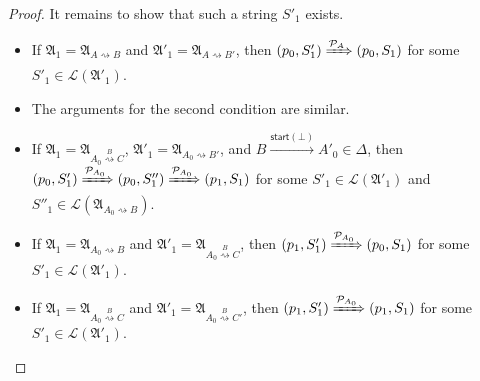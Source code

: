 \documentclass[preprint,12pt]{elsarticle}
\newcommand\Mm{{\mathcal{M} }}
\newcommand\Pp{{\mathcal{P} }}
\newcommand\aft{{\sf Aft}}
\newcommand\startactivity{{\mathsf{start} }}
\newcommand{\hide}[1]{}
\newcommand\aname{\mathfrak{n}}
\newcommand\Rel{\mathsf{Rel}}
\newcommand\Aut{{\mathfrak{A} }}
\newcommand\Lang{{\mathscr{L} }}
\begin{document}
\begin{proof}
It remains to show that such a string $S'_1$ exists. 
\begin{itemize}
\item If $\Aut_1 = \Aut_{A \rightsquigarrow B}$ and $\Aut'_1 = \Aut_{A \rightsquigarrow B'}$, then $(p_0, S'_1) \xRightarrow{\Pp_A} (p_0, S_1)$ for some $S'_1 \in \Lang(\Aut'_1)$. 
%
\item The arguments for the second condition are similar. 
%
\item If $\Aut_1 = \Aut_{A_0 \stackrel{B}{\rightsquigarrow} C}$, $\Aut'_1 = \Aut_{A_0 \rightsquigarrow B'}$, and $B \xrightarrow{\startactivity(\bot)} A'_0 \in \Delta$, then $(p_0, S'_1) \xRightarrow{\Pp_{A_0}} (p_0, S''_1) \xRightarrow{\Pp_{A_0}} (p_1, S_1)$ for some $S'_1 \in \Lang(\Aut'_1)$ and $S''_1 \in \Lang(\Aut_{A_0 \rightsquigarrow B})$. 
%
\item If $\Aut_1 = \Aut_{A_0 \rightsquigarrow B}$ and $\Aut'_1 = \Aut_{A_0 \stackrel{B}{\rightsquigarrow} C}$, then $(p_1, S'_1) \xRightarrow{\Pp_{A_0}}  (p_0, S_1)$ for some $S'_1 \in \Lang(\Aut'_1)$. 
%
\item If $\Aut_1 = \Aut_{A_0 \stackrel{B}{\rightsquigarrow} C}$ and $\Aut'_1 = \Aut_{A_0 \stackrel{B}{\rightsquigarrow} C'}$, then $(p_1, S'_1) \xRightarrow{\Pp_{A_0}}  (p_1, S_1)$ for some $S'_1 \in \Lang(\Aut'_1)$. 
\end{itemize}
 \hide{
Therefore, $(S'_1, S_2, \cdots, S_k) \in \Rel((\Aut_{A\rightsquigarrow B'}, \Aut_2, \cdots, \Aut_k))$ for some $S'_1 \in \Lang(\Aut_{A\rightsquigarrow B'})$. 

Then according to the induction hypothesis, 
$$(([A_0], \aft(A_0))) \xRightarrow[\Mm]{} ((S'_1, \aname_1), (S_2, \aname_2), \cdots, (S_k, \aname_k)).$$

From $S'_1 \in \Lang(\Aut_{A\rightsquigarrow B'})$, $S_1 \in \Lang(\Aut_{A\rightsquigarrow B})$, and the definition of $\Pp_A$, we know that $(p_0, S'_1) \xRightarrow{\Pp_A} (p_0, [A]) \xRightarrow{\Pp_A} (p_0, S_1)$. 

Therefore, 
$$((S'_1, \aname_1), (S_2, \aname_2), \cdots, (S_k, \aname_k)) \xRightarrow[\Mm]{} ((S_1, \aname_1), (S_2, \aname_2), \cdots, (S_k, \aname_k)).$$
It follows that 
$$(([A_0], \aft(A_0))) \xRightarrow[\Mm]{} ((S_1, \aname_1), (S_2, \aname_2), \cdots, (S_k, \aname_k)).$$
We conclude that the claim holds for $n$ in this case. 
    \item if $\Aut_1' = \Aut_{A_0\rightsquigarrow B'}$ for some $B'\in\Gamma_{A_0}\setminus\{A_0'\}$, then $\Aut_1 = \Aut_{A_0\rightsquigarrow B}$ for some $B\in\Gamma_{A_0}\setminus\{A_0'\}$.

}
\end{proof}
\end{document}
